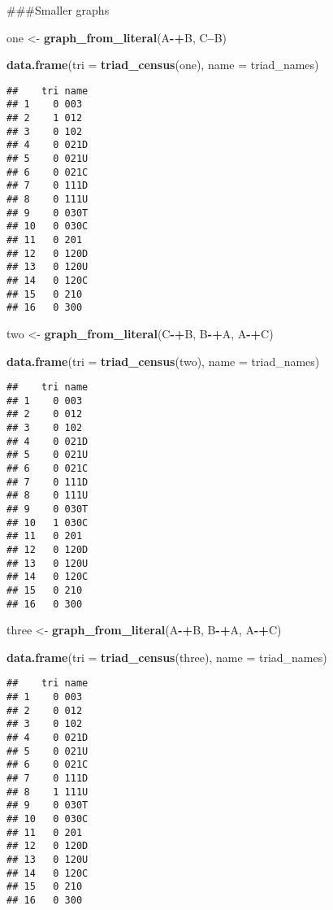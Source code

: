 \documentclass[]{article}
\newenvironment{Shaded}{\begin{snugshade}}{\end{snugshade}}
\newcommand{\DataTypeTok}[1]{\textcolor[rgb]{0.13,0.29,0.53}{#1}}
\newcommand{\KeywordTok}[1]{\textcolor[rgb]{0.13,0.29,0.53}{\textbf{#1}}}
\newcommand{\NormalTok}[1]{#1}
\newcommand{\OperatorTok}[1]{\textcolor[rgb]{0.81,0.36,0.00}{\textbf{#1}}}
\newcommand{\StringTok}[1]{\textcolor[rgb]{0.31,0.60,0.02}{#1}}
\begin{document}
\#\#\#Smaller graphs

\begin{Shaded}
\begin{Highlighting}[]
\NormalTok{one <-}\StringTok{ }\KeywordTok{graph_from_literal}\NormalTok{(A}\OperatorTok{-+}\NormalTok{B, C}\OperatorTok{--}\NormalTok{B)}

\KeywordTok{data.frame}\NormalTok{(}\DataTypeTok{tri =} \KeywordTok{triad_census}\NormalTok{(one), }\DataTypeTok{name =}\NormalTok{ triad_names)}
\end{Highlighting}
\end{Shaded}

\begin{verbatim}
##    tri name
## 1    0 003 
## 2    1 012 
## 3    0 102 
## 4    0 021D
## 5    0 021U
## 6    0 021C
## 7    0 111D
## 8    0 111U
## 9    0 030T
## 10   0 030C
## 11   0 201 
## 12   0 120D
## 13   0 120U
## 14   0 120C
## 15   0 210 
## 16   0 300
\end{verbatim}

\begin{Shaded}
\begin{Highlighting}[]
\NormalTok{two <-}\StringTok{ }\KeywordTok{graph_from_literal}\NormalTok{(C}\OperatorTok{-+}\NormalTok{B, B}\OperatorTok{-+}\NormalTok{A, A}\OperatorTok{-+}\NormalTok{C)}

\KeywordTok{data.frame}\NormalTok{(}\DataTypeTok{tri =} \KeywordTok{triad_census}\NormalTok{(two), }\DataTypeTok{name =}\NormalTok{ triad_names)}
\end{Highlighting}
\end{Shaded}

\begin{verbatim}
##    tri name
## 1    0 003 
## 2    0 012 
## 3    0 102 
## 4    0 021D
## 5    0 021U
## 6    0 021C
## 7    0 111D
## 8    0 111U
## 9    0 030T
## 10   1 030C
## 11   0 201 
## 12   0 120D
## 13   0 120U
## 14   0 120C
## 15   0 210 
## 16   0 300
\end{verbatim}

\begin{Shaded}
\begin{Highlighting}[]
\NormalTok{three <-}\StringTok{ }\KeywordTok{graph_from_literal}\NormalTok{(A}\OperatorTok{-+}\NormalTok{B, B}\OperatorTok{-+}\NormalTok{A, A}\OperatorTok{-+}\NormalTok{C)}

\KeywordTok{data.frame}\NormalTok{(}\DataTypeTok{tri =} \KeywordTok{triad_census}\NormalTok{(three), }\DataTypeTok{name =}\NormalTok{ triad_names)}
\end{Highlighting}
\end{Shaded}

\begin{verbatim}
##    tri name
## 1    0 003 
## 2    0 012 
## 3    0 102 
## 4    0 021D
## 5    0 021U
## 6    0 021C
## 7    0 111D
## 8    1 111U
## 9    0 030T
## 10   0 030C
## 11   0 201 
## 12   0 120D
## 13   0 120U
## 14   0 120C
## 15   0 210 
## 16   0 300
\end{verbatim}
\end{document}
